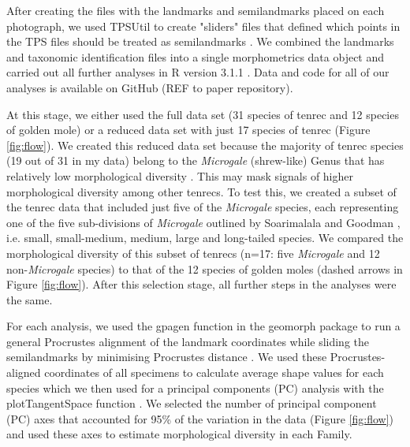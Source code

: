\documentclass[12pt,a4paper]{article}
\begin{document}
	
	After creating the files with the landmarks and semilandmarks placed on each photograph, we used TPSUtil \citep{Rohlf2012} to create "sliders" files that defined which points in the TPS files should be treated as semilandmarks \citep{Zelditch2012}. We combined the landmarks and taxonomic identification files into a single morphometrics data object and carried out all further analyses in R version 3.1.1 \citep{Team2014}. Data and code for all of our analyses is available on GitHub (REF to paper repository).
	
	At this stage, we either used the full data set (31 species of tenrec and 12 species of golden mole) or a reduced data set with just 17 species of tenrec (Figure \ref{fig:flow}). We created this reduced data set because the majority of tenrec species (19 out of 31 in my data) belong to the \textit{Microgale} (shrew-like) Genus that has relatively low morphological diversity \citep{Soarimalala2011, Jenkins2003}. This may mask signals of higher morphological diversity among other tenrecs. To test this, we created a subset of the tenrec data that included just five of the \textit{Microgale} species, each representing one of the five sub-divisions of \textit{Microgale} outlined by Soarimalala and Goodman \citeyearpar{Soarimalala2011}, i.e. small, small-medium, medium, large and long-tailed species. We compared the morphological diversity of this subset of tenrecs (n=17: five \textit{Microgale} and 12 non-\textit{Microgale} species) to that of the 12 species of golden moles (dashed arrows in Figure \ref{fig:flow}). After this selection stage, all further steps in the analyses were the same.
	
		
	For each analysis, we used the gpagen function in the geomorph package \citep{Adams2013} to run a general Procrustes alignment \citep{Rohlf1993} of the landmark coordinates while sliding the semilandmarks by minimising Procrustes distance \citep{Bookstein1997}. We used these Procrustes-aligned coordinates of all specimens to calculate average shape values for each species which we then used for a principal components (PC) analysis with the plotTangentSpace function \citep{Adams2013}. We selected the number of principal component (PC) axes that accounted for 95\% of the variation in the data (Figure \ref{fig:flow}) and used these axes to estimate morphological diversity in each Family.
\end{document}
